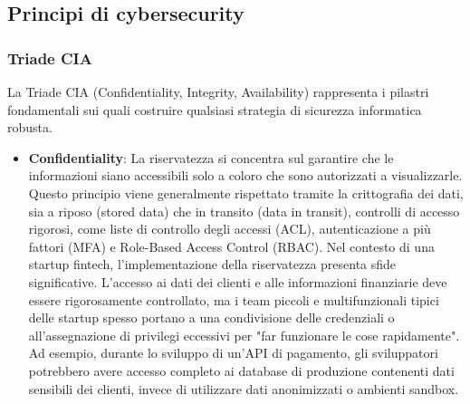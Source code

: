 \documentclass[a4paper,12pt]{report}
\begin{document}
\subsection{Principi di cybersecurity}

\subsubsection{Triade CIA}
La Triade CIA (Confidentiality, Integrity, Availability) rappresenta i pilastri fondamentali sui quali costruire qualsiasi strategia di sicurezza informatica robusta.
\begin{itemize}
    \item \textbf{Confidentiality}: La riservatezza si concentra sul garantire che le informazioni siano accessibili solo a coloro che sono autorizzati a visualizzarle.\cite{ciaPaper} Questo principio viene generalmente rispettato tramite la crittografia dei dati, sia a riposo (stored data) che in transito (data in transit), controlli di accesso rigorosi, come liste di controllo degli accessi (ACL), autenticazione a più fattori (MFA) e Role-Based Access Control (RBAC).
    Nel contesto di una startup fintech, l'implementazione della riservatezza presenta sfide significative. L'accesso ai dati dei clienti e alle informazioni finanziarie deve essere rigorosamente controllato, ma i team piccoli e multifunzionali tipici delle startup spesso portano a una condivisione delle credenziali o all'assegnazione di privilegi eccessivi per "far funzionare le cose rapidamente". Ad esempio, durante lo sviluppo di un'API di pagamento, gli sviluppatori potrebbero avere accesso completo ai database di produzione contenenti dati sensibili dei clienti, invece di utilizzare dati anonimizzati o ambienti sandbox.


\end{itemize}
\end{document}
